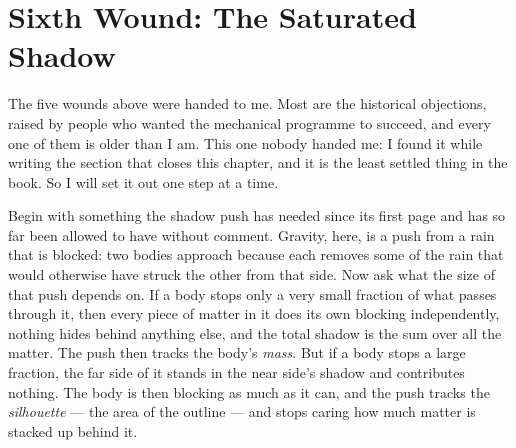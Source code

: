 \documentclass[fontsize=11pt,paper=a4,pagesize=auto,parskip=half-]{scrbook}
\begin{document}
\section{Sixth Wound: The Saturated Shadow}

The five wounds above were handed to me. Most are the historical objections, raised by people who wanted the mechanical programme to succeed, and every one of them is older than I am. This one nobody handed me: I found it while writing the section that closes this chapter, and it is the least settled thing in the book. So I will set it out one step at a time.

Begin with something the shadow push has needed since its first page and has so far been allowed to have without comment. Gravity, here, is a push from a rain that is blocked: two bodies approach because each removes some of the rain that would otherwise have struck the other from that side. Now ask what the size of that push depends on. If a body stops only a very small fraction of what passes through it, then every piece of matter in it does its own blocking independently, nothing hides behind anything else, and the total shadow is the sum over all the matter. The push then tracks the body's \emph{mass}. But if a body stops a large fraction, the far side of it stands in the near side's shadow and contributes nothing. The body is then blocking as much as it can, and the push tracks the \emph{silhouette} --- the area of the outline --- and stops caring how much matter is stacked up behind it.
\end{document}
